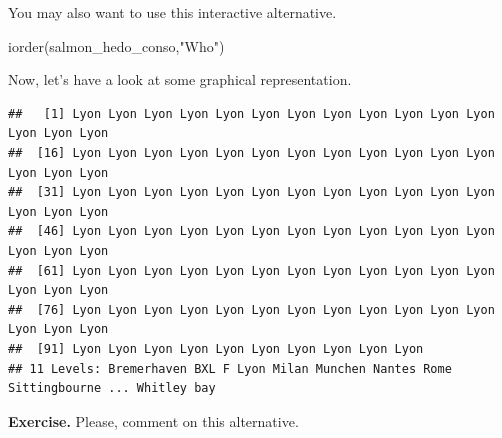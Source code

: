 \documentclass[
]{book}
\newenvironment{Shaded}{\begin{snugshade}}{\end{snugshade}}
\newcommand{\AttributeTok}[1]{\textcolor[rgb]{0.77,0.63,0.00}{#1}}
\newcommand{\CommentTok}[1]{\textcolor[rgb]{0.56,0.35,0.01}{\textit{#1}}}
\newcommand{\DecValTok}[1]{\textcolor[rgb]{0.00,0.00,0.81}{#1}}
\newcommand{\FunctionTok}[1]{\textcolor[rgb]{0.00,0.00,0.00}{#1}}
\newcommand{\NormalTok}[1]{#1}
\newcommand{\OtherTok}[1]{\textcolor[rgb]{0.56,0.35,0.01}{#1}}
\newcommand{\SpecialCharTok}[1]{\textcolor[rgb]{0.00,0.00,0.00}{#1}}
\newcommand{\StringTok}[1]{\textcolor[rgb]{0.31,0.60,0.02}{#1}}
\begin{document}
\begin{Shaded}
\end{Shaded}

You may also want to use this interactive alternative.

\begin{Shaded}
\begin{Highlighting}[]
\FunctionTok{iorder}\NormalTok{(salmon\_hedo\_conso,}\StringTok{"Who"}\NormalTok{)}
\end{Highlighting}
\end{Shaded}

Now, let's have a look at some graphical representation.

\begin{Shaded}
\end{Shaded}

\begin{verbatim}
##   [1] Lyon Lyon Lyon Lyon Lyon Lyon Lyon Lyon Lyon Lyon Lyon Lyon Lyon Lyon Lyon
##  [16] Lyon Lyon Lyon Lyon Lyon Lyon Lyon Lyon Lyon Lyon Lyon Lyon Lyon Lyon Lyon
##  [31] Lyon Lyon Lyon Lyon Lyon Lyon Lyon Lyon Lyon Lyon Lyon Lyon Lyon Lyon Lyon
##  [46] Lyon Lyon Lyon Lyon Lyon Lyon Lyon Lyon Lyon Lyon Lyon Lyon Lyon Lyon Lyon
##  [61] Lyon Lyon Lyon Lyon Lyon Lyon Lyon Lyon Lyon Lyon Lyon Lyon Lyon Lyon Lyon
##  [76] Lyon Lyon Lyon Lyon Lyon Lyon Lyon Lyon Lyon Lyon Lyon Lyon Lyon Lyon Lyon
##  [91] Lyon Lyon Lyon Lyon Lyon Lyon Lyon Lyon Lyon Lyon
## 11 Levels: Bremerhaven BXL F Lyon Milan Munchen Nantes Rome Sittingbourne ... Whitley bay
\end{verbatim}

\begin{Shaded}
\end{Shaded}

\textbf{Exercise. }Please, comment on this alternative.

\begin{Shaded}
\end{Shaded}
\end{document}
